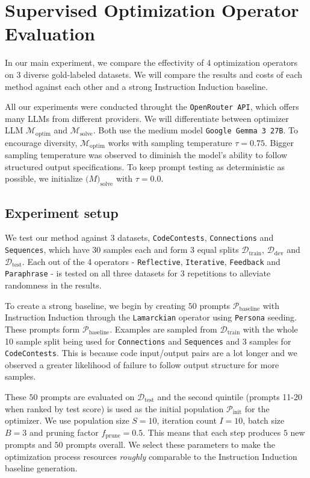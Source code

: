 \section{Supervised Optimization Operator Evaluation}
In our main experiment, we compare the effectivity of 4 optimization operators on 3 diverse gold-labeled datasets.
We will compare the results and costs of each method against each other and a strong Instruction Induction baseline.

All our experiments were conducted throught the \texttt{OpenRouter API}, which offers many LLMs from different providers.
We will differentiate between optimizer LLM $\mathcal{M}_{\text{optim}}$ and $\mathcal{M}_{\text{solve}}$.
Both use the medium model \texttt{Google Gemma 3 27B}\cite{gemmateam2025gemma3technicalreport}. 
To encourage diversity, $\mathcal{M}_{\text{optim}}$ works with sampling temperature $\tau = 0.75$. 
Bigger sampling temperature was observed to diminish the model's ability to follow structured output specifications.
To keep prompt testing as deterministic as possible, we initialize $\mathcal(M)_{\text{solve}}$ with $\tau = 0.0$.


\subsection{Experiment setup}
We test our method against 3 datasets, \texttt{CodeContests}, \texttt{Connections}  and \texttt{Sequences}, which have 30 samples each 
and form 3 equal splits $\mathcal{D}_{\text{train}}$, $\mathcal{D}_{\text{dev}}$ and $\mathcal{D}_{\text{test}}$. Each out of the 4 operators - \texttt{Reflective}, \texttt{Iterative}, \texttt{Feedback} and \texttt{Paraphrase} - is tested on all three datasets for 3 repetitions
to alleviate randomness in the results.

To create a strong baseline, we begin by creating $50$ prompts $\mathcal{P}_{\text{baseline}}$ with Instruction Induction through the \texttt{Lamarckian} operator 
using \texttt{Persona}\cite{ge2024scalingsyntheticdatacreation} seeding. These prompts form $\mathcal{P}_{\text{baseline}}$. Examples are sampled from $\mathcal{D}_{\text{train}}$ with the whole 10 sample split being used for \texttt{Connections} and \texttt{Sequences}
and 3 samples for \texttt{CodeContests}. This is because code input/output pairs are a lot longer and we observed a greater likelihood of failure to follow output structure for more samples.

These $50$ prompts are evaluated on $\mathcal{D}_{\text{test}}$ and the second quintile (prompts 11-20 when ranked by test score) is used as the initial population $\mathcal{P}_{\text{init}}$ for the optimizer.
We use population size $S=10$, iteration count $I=10$, batch size $B=3$ and pruning factor $f_{\text{prune}} = 0.5$. This means that each step produces $5$ new prompts and $50$ prompts overall.
We select these parameters to make the optimization process resources \textit{roughly} comparable to the Instruction Induction baseline generation.


